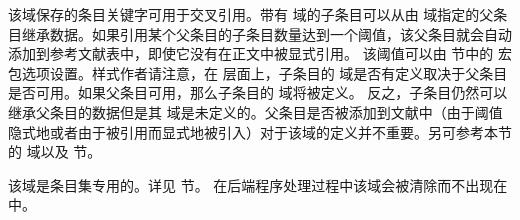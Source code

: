 \begin{fieldlist}



该域保存的条目关键字可用于交叉引用。带有  域的子条目可以从由  域指定的父条目继承数据。如果引用某个父条目的子条目数量达到一个阈值，该父条目就会自动添加到参考文献表中，即使它没有在正文中被显式引用。
该阈值可以由  节中的  宏包选项设置。样式作者请注意，在 \biblatex 层面上，子条目的  域是否有定义取决于父条目是否可用。如果父条目可用，那么子条目的  域将被定义。
反之，子条目仍然可以继承父条目的数据但是其  域是未定义的。父条目是否被添加到文献中（由于阈值隐式地或者由于被引用而显式地被引入）对于该域的定义并不重要。另可参考本节的  域以及  节。




该域是条目集专用的。详见  节。
在后端程序处理过程中该域会被清除而不出现在  中。


\end{fieldlist}
